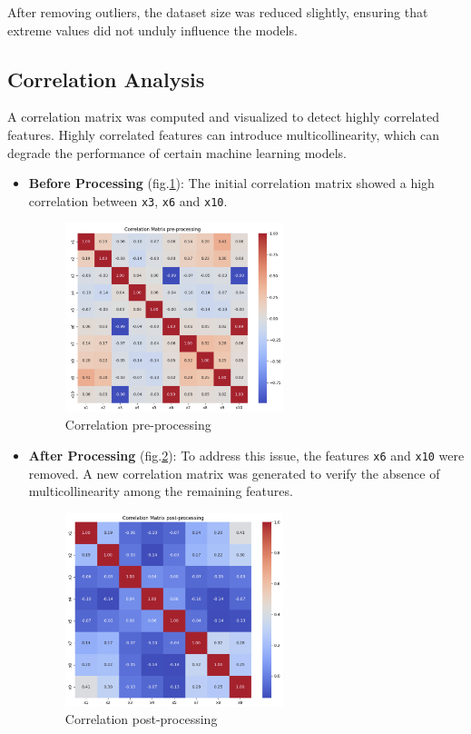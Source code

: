 \documentclass[a4paper, 10pt]{article}
\begin{document}
After removing outliers, the dataset size was reduced slightly, ensuring that extreme values did not unduly influence the models.

\subsection{Correlation Analysis}

A correlation matrix was computed and visualized to detect highly correlated features. Highly correlated features can introduce multicollinearity, which can degrade the performance of certain machine learning models.

\begin{itemize}
    \item \textbf{Before Processing} (fig.\ref{fig:corrpre}): The initial correlation matrix showed a high correlation between \texttt{x3}, \texttt{x6} and \texttt{x10}.
    \begin{figure}[H]
    \centering
    \includegraphics[width=0.6\textwidth]{images/corrpre.png}
    \caption{Correlation pre-processing}
    \label{fig:corrpre}
\end{figure}
    \item \textbf{After Processing} (fig.\ref{fig:corrpost}): To address this issue, the features \texttt{x6} and \texttt{x10} were removed. A new correlation matrix was generated to verify the absence of multicollinearity among the remaining features.
    \begin{figure}[H]
    \centering
    \includegraphics[width=0.6\textwidth]{images/corrpost.png}
    \caption{Correlation post-processing}
    \label{fig:corrpost}
\end{figure}
\end{itemize}
\end{document}
